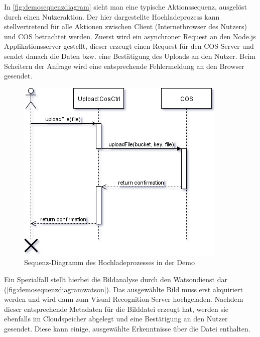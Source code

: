 In \autoref{fig:demosequenzdiagram} sieht man eine typische Aktionssequenz, ausgelöst durch einen Nutzeraktion. Der hier dargestellte Hochladeprozess kann stellvertretend für alle Aktionen zwischen Client (Internetbrowser des Nutzers) und \ac{COS} betrachtet werden.
Zuerst wird ein asynchroner Request an den Node.js Applikationsserver gestellt, dieser erzeugt einen Request für den \ac{COS}-Server und sendet danach die Daten bzw. eine Bestätigung des Uploads an den Nutzer.
Beim Scheitern der Anfrage wird eine entsprechende Fehlermeldung an den Browser gesendet.

\begin{figure}[hbt]
	\centering
	\includegraphics[scale=0.85]{images/demo-sequenz-diagram}
	\caption{Sequenz-Diagramm des Hochladeprozesses in der Demo}
	\label{fig:demosequenzdiagram}
\end{figure}

Ein Spezialfall stellt hierbei die Bildanalyse durch den Watsondienst dar (\autoref{fig:demosequenzdiagramwatson}). Das ausgewählte Bild muss erst akquiriert werden und wird dann zum Visual Recognition-Server hochgeladen. Nachdem dieser entsprechende Metadaten für die Bilddatei erzeugt hat, werden sie ebenfalls im Cloudspeicher abgelegt und eine Bestätigung an den Nutzer gesendet.
Diese kann einige, ausgewählte Erkenntnisse über die Datei enthalten.

